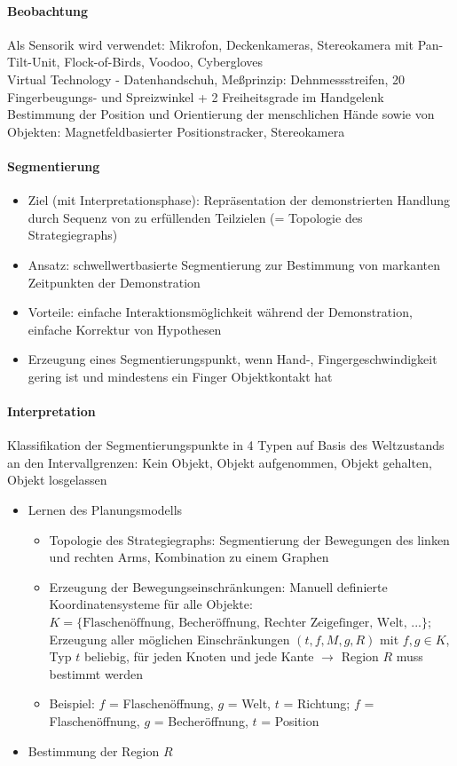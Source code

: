 \paragraph*{Beobachtung} Als Sensorik wird verwendet: Mikrofon, Deckenkameras, Stereokamera mit Pan-Tilt-Unit, Flock-of-Birds, Voodoo, Cybergloves\\
Virtual Technology - Datenhandschuh, Meßprinzip: Dehnmessstreifen, 20 Fingerbeugungs- und Spreizwinkel + 2 Freiheitsgrade im Handgelenk\\
Bestimmung der Position und Orientierung der menschlichen Hände sowie von Objekten: Magnetfeldbasierter Positionstracker, Stereokamera

\paragraph*{Segmentierung}
\begin{itemize}
\item Ziel (mit Interpretationsphase): Repräsentation der demonstrierten Handlung durch Sequenz von zu
erfüllenden Teilzielen (= Topologie des Strategiegraphs)
\item Ansatz: schwellwertbasierte Segmentierung zur Bestimmung von markanten Zeitpunkten der Demonstration
\item Vorteile: einfache Interaktionsmöglichkeit während der Demonstration, einfache Korrektur von Hypothesen
\item Erzeugung eines Segmentierungspunkt, wenn Hand-, Fingergeschwindigkeit gering ist und mindestens ein Finger Objektkontakt %
hat
\end{itemize}

\paragraph*{Interpretation} Klassifikation der Segmentierungspunkte in 4 Typen auf Basis des Weltzustands an den Intervallgrenzen: Kein Objekt, Objekt aufgenommen, Objekt gehalten, Objekt losgelassen

\begin{itemize}
\item Lernen des Planungsmodells
\begin{itemize}
\item  Topologie des Strategiegraphs: Segmentierung der Bewegungen des linken und rechten Arms, Kombination zu einem Graphen
\item Erzeugung der Bewegungseinschränkungen: Manuell definierte Koordinatensysteme für alle Objekte: $K = \{ \text{Flaschenöffnung, Becheröffnung,
Rechter Zeigefinger, Welt, ...} \}$; Erzeugung aller möglichen Einschränkungen $(t, f, M, g, R)$ mit $f,g \in K$, Typ $t$ beliebig,
für jeden Knoten und jede Kante $\rightarrow$ Region $R$ muss bestimmt werden
\item Beispiel: $f$ = Flaschenöffnung, $g$ = Welt, $t$ = Richtung; $f$ = Flaschenöffnung, $g$ = Becheröffnung, $t$ = Position
\end{itemize}
\item Bestimmung der Region $R$
\end{itemize}


